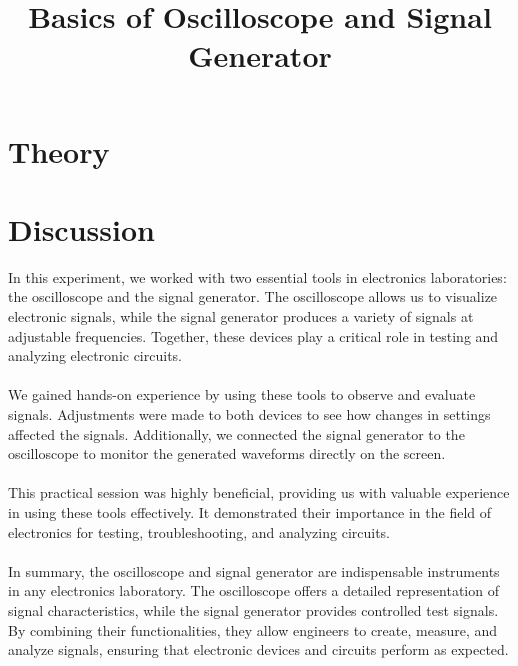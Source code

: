 \documentclass[12pt]{article}
\title{Basics of Oscilloscope and Signal Generator}
\author{}
\date{}
\begin{document}


\pagebreak

\tableofcontents

\pagebreak
{}
\maketitle

\section*{Theory}


\section*{Discussion}
In this experiment, we worked with two essential tools in electronics laboratories: the oscilloscope and the signal generator. The oscilloscope allows us to visualize electronic signals, while the signal generator produces a variety of signals at adjustable frequencies. Together, these devices play a critical role in testing and analyzing electronic circuits.\\\\
We gained hands-on experience by using these tools to observe and evaluate signals. Adjustments were made to both devices to see how changes in settings affected the signals. Additionally, we connected the signal generator to the oscilloscope to monitor the generated waveforms directly on the screen.\\\\
This practical session was highly beneficial, providing us with valuable experience in using these tools effectively. It demonstrated their importance in the field of electronics for testing, troubleshooting, and analyzing circuits.\\\\
In summary, the oscilloscope and signal generator are indispensable instruments in any electronics laboratory. The oscilloscope offers a detailed representation of signal characteristics, while the signal generator provides controlled test signals. By combining their functionalities, they allow engineers to create, measure, and analyze signals, ensuring that electronic devices and circuits perform as expected.
\end{document}
